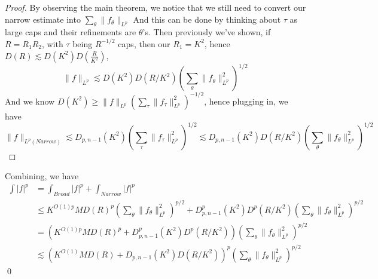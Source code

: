 \begin{proof}
    By observing the main theorem, we notice that we still need to convert our narrow estimate into $\sum_\theta\|f_\theta\|_{L^p}$
    And this can be done by thinking about $\tau$ as large caps and their refinements are $\theta$'s. Then previously we've shown, if $R=R_1R_2$, with $\tau$ being $R^{-1/2}$ caps, then our $R_1=K^2$, hence $D(R)\lesssim D(K^2)D(\frac{R}{K^2})$,
    \begin{equation*}
        \|f\|_{L^p}\lesssim D(K^2)D(R/K^2)\left(\sum_\theta\|f_\theta\|_{L^p}^2 \right)^{1/2}
    \end{equation*}
    And we know $D(K^2)\geq\|f\|_{L^p}\left(\sum_\tau\|f_\tau\|_{L^p}^2 \right)^{-1/2}$, hence plugging in, we have
    \begin{equation*}
        \|f\|_{L^p(Narrow)}\lesssim D_{p,n-1}(K^2)\left(\sum_\tau\|f_\tau\|_{L^p}^2 \right)^{1/2}\lesssim D_{p,n-1}(K^2)D(R/K^2)\left(\sum_\theta\|f_\theta\|_{L^p}^2 \right)^{1/2}
    \end{equation*}
\end{proof}
    Combining, we have
    \begin{align*}
        \int|f|^p&=\int_{Broad}|f|^p+\int_{Narrow}|f|^p\\
        &\leq K^{O(1)p}MD(R)^p\left(\sum_\theta\|f_\theta\|_{L^p}^2 \right)^{p/2}+D_{p,n-1}^p(K^2)D^p(R/K^2)\left(\sum_\theta\|f_\theta\|_{L^p}^2 \right)^{p/2}\\
        &=\left(K^{O(1)p}MD(R)^p+D_{p,n-1}^p(K^2)D^p(R/K^2)\right)\left(\sum_\theta\|f_\theta\|_{L^p}^2 \right)^{p/2}\\
        &\lesssim \left(K^{O(1)}MD(R)+D_{p,n-1}(K^2)D(R/K^2)\right)^p\left(\sum_\theta\|f_\theta\|_{L^p}^2 \right)^{p/2}
    \end{align*}
\qed


